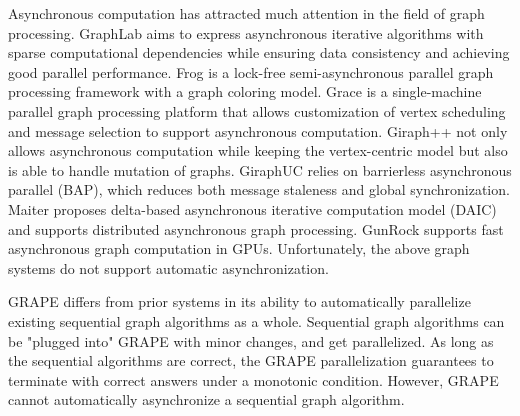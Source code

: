 
 Asynchronous computation has attracted much attention in the field of graph processing. GraphLab \cite{Low:2012:DGF:2212351.2212354} aims to express asynchronous iterative algorithms with sparse computational dependencies while ensuring data consistency and achieving good parallel performance. Frog \cite{8017445} is a lock-free semi-asynchronous parallel graph processing framework with a graph coloring model. Grace \cite{grace} is a single-machine parallel graph processing platform that allows customization of vertex scheduling and message selection to support asynchronous computation. Giraph++ \cite{Tian:2013:TLV:2732232.2732238} not only allows asynchronous computation while keeping the vertex-centric model but also is able to handle mutation of graphs. GiraphUC \cite{Han:2015:GUB:2777598.2777604} relies on barrierless asynchronous parallel (BAP), which reduces both message staleness and global synchronization. Maiter \cite{maiter} proposes delta-based asynchronous iterative computation model (DAIC) and supports distributed asynchronous graph processing. GunRock \cite{Wang:2016:GHG:2851141.2851145} supports fast asynchronous graph computation in GPUs. Unfortunately, the above graph systems do not support automatic asynchronization.


GRAPE \cite{Fan:2017:PSG:3035918.3035942} differs from prior systems in its ability to automatically parallelize existing sequential graph algorithms as a whole. Sequential graph algorithms can be "plugged into" GRAPE with minor changes, and get parallelized. As long as the sequential algorithms are correct, the GRAPE parallelization guarantees to terminate with correct answers under a monotonic condition. However, GRAPE cannot automatically asynchronize a sequential graph algorithm.



